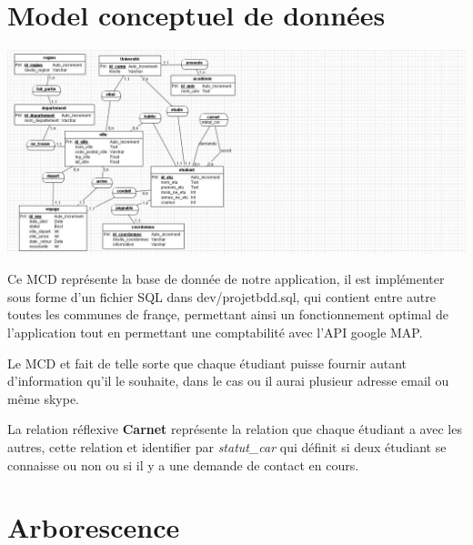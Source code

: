 \documentclass[a4paper,10pt]{report}
\begin{document}
\section{Model conceptuel de donn\'ees}

\begin{center}
    \includegraphics[scale=0.7]{../dev/mcd_covoiturage.jpg}
\end{center}

Ce MCD repr\'esente la base de donn\'ee de notre application, il est impl\'ementer
sous forme d'un fichier SQL dans dev/projetbdd.sql, qui contient entre autre toutes
les communes de fran\c{c}e, permettant ainsi un fonctionnement optimal de l'application
tout en permettant une comptabilit\'e avec l'API google MAP.

Le MCD et fait de telle sorte que chaque \'etudiant puisse fournir autant d'information
qu'il le souhaite, dans le cas ou il aurai plusieur adresse email ou m\^eme skype.

La relation r\'eflexive \textbf{Carnet} repr\'esente la relation que chaque \'etudiant
a avec les autres, cette relation et identifier par \textit{statut\_car} qui d\'efinit 
si deux \'etudiant se connaisse ou non ou si il y a une demande de contact en cours.

\section{Arborescence}
\end{document}
